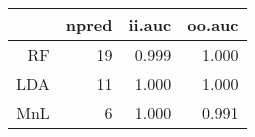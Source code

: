 \begin{table}[ht]
\centering
\begin{tabular}{rrrr}
  \hline
 & npred & ii.auc & oo.auc \\ 
  \hline
RF &   19 & 0.999 & 1.000 \\ 
  LDA &   11 & 1.000 & 1.000 \\ 
  MnL &    6 & 1.000 & 0.991 \\ 
   \hline
\end{tabular}
\label{tab:second_res}
\end{table}
